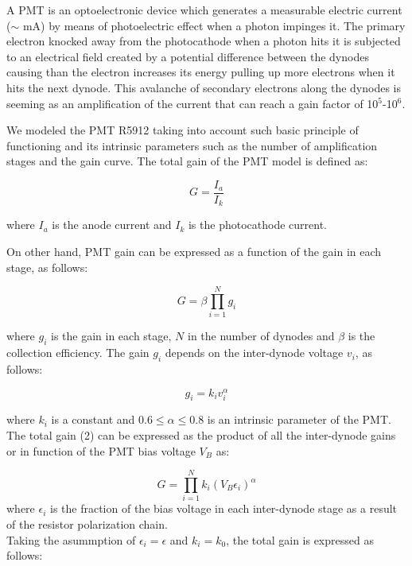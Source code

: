 \documentclass[letterpaper, 10 pt, conference]{ieeeconf}  %
\begin{document}
A PMT is an optoelectronic device which generates a measurable electric current ($\sim$ mA) by means of photoelectric effect when a photon impinges it. The primary electron knocked away from the photocathode when a photon hits it is subjected to an electrical field created by a potential difference between the dynodes causing than the electron increases its energy pulling up more electrons when it hits the next dynode. This avalanche of secondary electrons along the dynodes is seeming as an amplification of the current that can reach a gain factor of 10$^5$-10$^6$.



We modeled the PMT R5912 taking into account such basic principle of functioning and its intrinsic parameters such as the number of amplification stages and the gain curve. The total gain of the PMT model is defined as:

\begin{equation}
G = \frac{I_a}{I_k}
\end{equation}

where $I_a$ is the anode current and $I_k$ is the photocathode current.

On other hand, PMT gain can be expressed as a function of the gain in each stage, as follows:

\begin{equation}
G =  \beta \prod_{i=1}^{N}  g_i 
\end{equation}

where $g_i$ is the gain in each stage, $N$ in the number of dynodes and $\beta$ is the collection efficiency. The gain $g_i$ depends on the inter-dynode voltage $v_i$, as follows:

\begin{equation}
g_i = k_i v_i^\alpha
\end{equation}

where $k_i$ is a constant and $ 0.6  \leq \alpha \leq 0.8$ is an intrinsic parameter of the PMT. The total gain (2) can be expressed as the product of all the inter-dynode gains or in function of the PMT bias voltage $V_B$ as:

\begin{equation}
G =  \prod_{i=1}^{N}  k_i (V_B \epsilon_i)^{\alpha} 
\end{equation}
where $\epsilon_i$ is the fraction of the bias voltage in each inter-dynode stage as a result of the resistor polarization chain.\\

Taking the asummption of $\epsilon_i = \epsilon$ and $k_i=k_0$, the total gain is expressed as follows:
\end{document}

